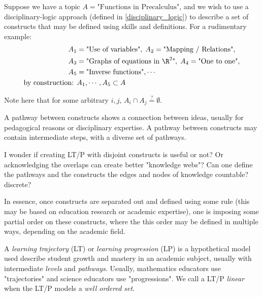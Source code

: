 \documentclass{TC}
\begin{document}
\begin{example}
Suppose we have a topic $A = \text{"Functions in Precalculus"}$, and we wish to use a disciplinary-logic approach (defined in \ref{disciplinary_logic}) to describe a set of constructs that may be defined using skills and definitions. For a rudimentary example:
\begin{align*}
A_1 &= \text{"Use of variables"},\;A_2 = \text{"Mapping / Relations"},\\
A_3 &= \text{"Graphs of equations in } \R^2 \text{"},\;A_4 = \text{"One to one"},\\
A_5 &= \text{"Inverse functions"}, \cdots \\
\text{by construction: }& A_1, \cdots, A_5 \subset A
\end{align*} 
\end{example}
Note here that for some arbitrary $i,j$, $A_i \cap A_j \stackrel{?}{=} \emptyset$. 
\begin{mdframed}
\begin{definition}
A pathway between constructs shows a connection between ideas, usually for pedagogical reasons or disciplinary expertise. A pathway between constructs may contain intermediate steps, with a diverse set of pathways. 
\end{definition}
\end{mdframed}

\begin{remark}
I wonder if creating LT/P with disjoint constructs is useful or not? Or acknowledging the overlaps can create better "knowledge webs"? Can one define the pathways and the constructs the edges and nodes of knowledge countable? discrete?
\end{remark}
 
 In essence, once constructs are separated out and defined using some rule (this may be based on education research or academic expertise), one is imposing some partial order on these constructs, where the this order may be defined in multiple ways, depending on the academic field.
 
 \begin{mdframed}
\begin{definition}
A \emph{learning trajectory} (LT) or \emph{learning progression} (LP) is a hypothetical model used describe student growth and mastery in an academic subject, usually with intermediate \emph{levels} and \emph{pathways}. Usually, mathematics educators use "trajectories" and science educators use "progressions". We call a LT/P \emph{linear} when the LT/P models a \emph{well ordered set}.
\end{definition}
\end{mdframed}
\end{document}

